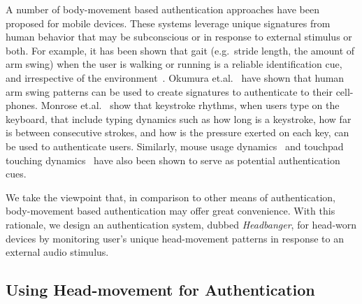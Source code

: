 

A number of body-movement based authentication approaches have been proposed for mobile devices. These systems
leverage unique signatures from human behavior that may be subconscious
or in response to external stimulus or both.  For example, it has been shown that gait (e.g.~stride length, the amount of arm swing) when the user is walking or
running is a reliable identification cue, and irrespective of the
environment~\cite{stevenage1999visual}. Okumura et.al.~\cite{okumura2006study}
have shown that human arm swing patterns can be used to create signatures
to authenticate to their cell-phones. Monrose
et.al.~\cite{monrose2000keystroke} show that keystroke rhythms, when
users type on the keyboard, that include typing dynamics such as how
long is a keystroke, how far is between consecutive strokes, and how is the
pressure exerted on each key, can be used to authenticate
users. Similarly, mouse usage dynamics~\cite{jorgensen2011mouse} and touchpad
touching dynamics~\cite{bo2013silentsense,de2012touch} have also been shown to
serve as potential authentication cues.

We take the viewpoint that, in comparison to other means of authentication, body-movement based
authentication may offer great convenience. %
With this rationale, we design an authentication system, dubbed {\em Headbanger}, for head-worn
devices by monitoring user's unique head-movement patterns in response to an
external audio stimulus.

\subsection{Using Head-movement for Authentication}
\label{subsec:headmovements}

